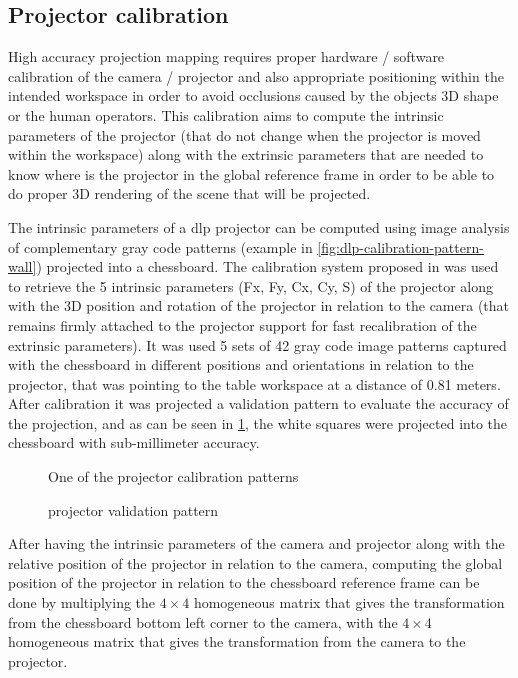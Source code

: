 \subsection{Projector calibration}

High accuracy projection mapping requires proper hardware / software calibration of the camera / projector and also appropriate positioning within the intended workspace in order to avoid occlusions caused by the objects 3D shape or the human operators. This calibration aims to compute the intrinsic parameters of the projector (that do not change when the projector is moved within the workspace) along with the extrinsic parameters that are needed to know where is the projector in the global reference frame in order to be able to do proper 3D rendering of the scene that will be projected.

The intrinsic parameters of a \gls{dlp} projector can be computed using image analysis of complementary gray code patterns (example in \cref{fig:dlp-calibration-pattern-wall}) projected into a chessboard. The calibration system proposed in \cite{Moreno2012} was used to retrieve the 5 intrinsic parameters (Fx, Fy, Cx, Cy, S) of the projector along with the 3D position and rotation of the projector in relation to the camera (that remains firmly attached to the projector support for fast recalibration of the extrinsic parameters). It was used 5 sets of 42 gray code image patterns captured with the chessboard in different positions and orientations in relation to the projector, that was pointing to the table workspace at a distance of 0.81 meters. After calibration it was projected a validation pattern to evaluate the accuracy of the projection, and as can be seen in \cref{fig:dlp-projected-chessboard}, the white squares were projected into the chessboard with sub-millimeter accuracy.

\begin{figure}[H]
	\begin{floatrow}[2]
		{\caption{One of the  projector calibration patterns}\label{fig:dlp-calibration-pattern-wall}}
		{\caption{ projector validation pattern}\label{fig:dlp-projected-chessboard}}
	\end{floatrow}
\end{figure}

After having the intrinsic parameters of the camera and projector along with the relative position of the projector in relation to the camera, computing the global position of the projector in relation to the chessboard reference frame can be done by multiplying the $4 \times 4$ homogeneous matrix that gives the transformation from the chessboard bottom left corner to the camera, with the $4 \times 4$ homogeneous matrix that gives the transformation from the camera to the projector.

